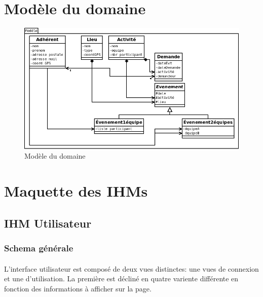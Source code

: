 \documentclass[a4paper,11pt]{article}
\begin{document}
\begin{titlepage}
  
\end{titlepage}
\tableofcontents
\pagebreak


\section{Modèle du domaine}

\begin{figure}[h]
  \begin{center}
    \includegraphics[width=15cm]{../modèle.png}
    \caption{Modèle du domaine}
  \end{center}
\end{figure}

\pagebreak
\section{Maquette des IHMs}

\subsection{IHM Utilisateur}

\subsubsection{Schema générale}

\paragraph{}
L'interface utilisateur est composé de deux vues distinctes: une vues de connexion et une d'utilisation. La première est décliné en quatre variente différente en fonction des informations à afficher sur la page.
\end{document}
